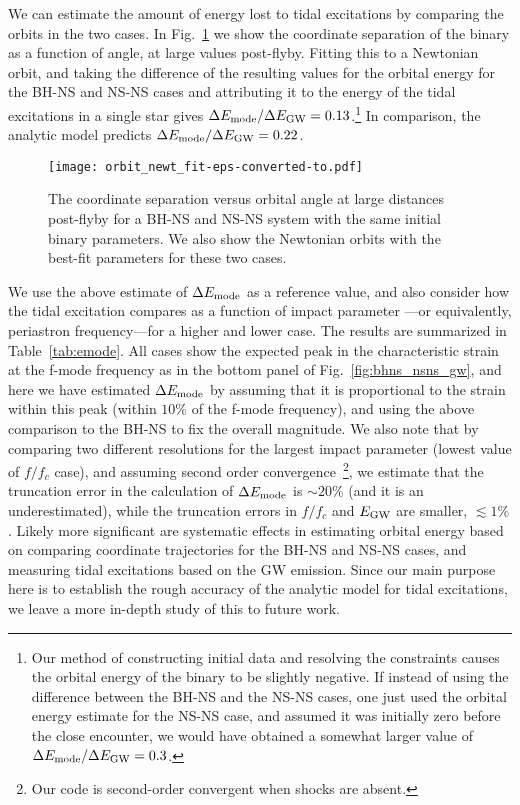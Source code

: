 \documentclass[prd,aps,floatfix,superscriptaddress,nofootinbib,twocolumn,10pt,English]{revtex4}
\begin{document}
We can estimate the amount of energy lost to tidal excitations by comparing the
orbits in the two cases. In Fig.~\ref{fig:bhns_nsns_orbit} we show the
coordinate separation of the binary as a function of angle, at large values
post-flyby.  Fitting this to a Newtonian orbit, and taking the difference
of the resulting values for the orbital energy for the BH-NS and NS-NS cases
and attributing it to the energy of the tidal excitations in a single star
gives $\Delta E_{\rm mode}/\Delta E_{\rm GW}=0.13$.\footnote{
Our method of constructing initial data and resolving the constraints causes
the orbital energy of the binary to be slightly negative.  
If instead of using the difference between the BH-NS and the NS-NS cases, one just used the orbital energy
estimate for the NS-NS case, and assumed it was initially zero before the close
encounter, we would have obtained a somewhat larger value of $\Delta E_{\rm mode}/\Delta E_{\rm GW}=0.3$. 
}
In comparison, the analytic model predicts $\Delta E_{\rm mode}/\Delta E_{\rm GW}=0.22$.

\begin{figure}
    \begin{center}
        \texttt{[image: orbit\_newt\_fit-eps-converted-to.pdf]}
    \end{center}
    \caption{
        The coordinate separation versus orbital angle at large distances
        post-flyby for a BH-NS and NS-NS system with the same initial 
        binary parameters. We also show the Newtonian
        orbits with the best-fit parameters for these two cases.
        \label{fig:bhns_nsns_orbit}
    }
\end{figure}

We use the above estimate of $\Delta E_{\rm mode}$ as a reference
value, and also consider how the tidal excitation compares as a
function of impact parameter ---or equivalently, periastron
frequency---for a higher and lower case. The results are summarized in
Table~\ref{tab:emode}. All cases show the expected peak in the
characteristic strain at the f-mode frequency as in the bottom panel
of Fig.~\ref{fig:bhns_nsns_gw}, and here we have estimated $\Delta
E_{\rm mode}$ by assuming that it is proportional to the strain within
this peak (within $10\%$ of the f-mode frequency), and using the above
comparison to the BH-NS to fix the overall magnitude. We also note
that by comparing two different resolutions for the largest impact
parameter (lowest value of $f/f_c$ case), and assuming second order
convergence~\footnote{Our code is second-order convergent when shocks
  are absent.}, we estimate that the truncation error in the
calculation of $\Delta E_{\rm mode}$ is $\sim20\%$ (and it is an
underestimated), while the truncation errors in $f/f_c$ and $E_{\rm
  GW}$ are smaller, $\lesssim1\%$. Likely more significant are
systematic effects in estimating orbital energy based on comparing
coordinate trajectories for the BH-NS and NS-NS cases, and measuring
tidal excitations based on the GW emission. Since our main purpose
here is to establish the rough accuracy of the analytic model for
tidal excitations, we leave a more in-depth study of this to future
work.
\end{document}
